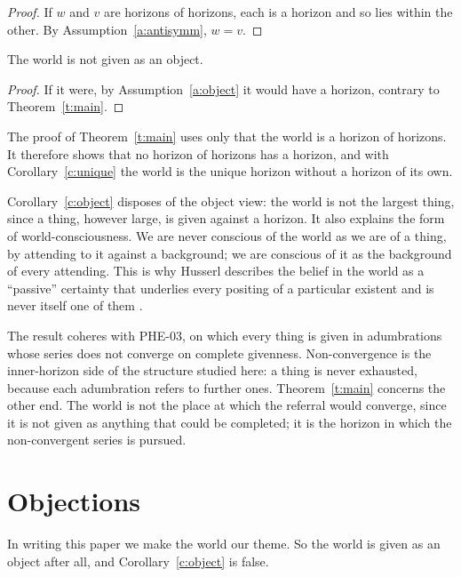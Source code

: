 \documentclass{situationist-preprint}
\begin{document}
\begin{proof}
If $w$ and $v$ are horizons of horizons, each is a horizon and so lies within the other. By Assumption~\ref{a:antisymm}, $w = v$.
\end{proof}

\begin{corollary}\label{c:object}
The world is not given as an object.
\end{corollary}

\begin{proof}
If it were, by Assumption~\ref{a:object} it would have a horizon, contrary to Theorem~\ref{t:main}.
\end{proof}

\begin{remark}\label{r:general}
The proof of Theorem~\ref{t:main} uses only that the world is a horizon of horizons. It therefore shows that no horizon of horizons has a horizon, and with Corollary~\ref{c:unique} the world is the unique horizon without a horizon of its own.
\end{remark}

Corollary~\ref{c:object} disposes of the object view: the world is not the largest thing, since a thing, however large, is given against a horizon. It also explains the form of world-consciousness. We are never conscious of the world as we are of a thing, by attending to it against a background; we are conscious of it as the background of every attending. This is why Husserl describes the belief in the world as a \enquote{passive} certainty that underlies every positing of a particular existent and is never itself one of them \citep[§7]{Husserl1939}.

The result coheres with PHE-03, on which every thing is given in adumbrations whose series does not converge on complete givenness. Non-convergence is the inner-horizon side of the structure studied here: a thing is never exhausted, because each adumbration refers to further ones. Theorem~\ref{t:main} concerns the other end. The world is not the place at which the referral would converge, since it is not given as anything that could be completed; it is the horizon in which the non-convergent series is pursued.

\section{Objections}

\begin{objection}
In writing this paper we make the world our theme. So the world is given as an object after all, and Corollary~\ref{c:object} is false.
\end{objection}
\end{document}
